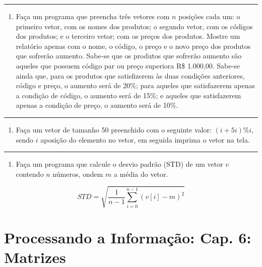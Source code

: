 \documentclass[12pt,a4paper]{article}
\renewcommand{\linethickness}{0.05em}
\providecommand{\tightlist}{%
      \setlength{\itemsep}{0pt}\setlength{\parskip}{0pt}}
\begin{document}
    \begin{center}\rule{0.5\linewidth}{\linethickness}\end{center}

\begin{enumerate}
\def\labelenumi{\arabic{enumi}.}
\setcounter{enumi}{32}
\tightlist
\item
  Faça um programa que preencha três vetores com \(n\) posições cada um:
  o primeiro vetor, com os nomes dos produtos; o segundo vetor, com os
  códigos dos produtos; e o terceiro vetor; com os preços dos produtos.
  Mostre um relatório apenas com o nome, o código, o preço e o novo
  preço dos produtos que sofrerão aumento. Sabe-se que os produtos que
  sofrerão aumento são aqueles que possuem código par ou preço superiora
  R\$ 1.000,00. Sabe-se ainda que, para os produtos que satisfizerem às
  duas condições anteriores, código e preço, o aumento será de 20\%;
  para aqueles que satisfazerem apenas a condição de código, o aumento
  será de 15\%; e aqueles que satisfazerem apenas a condição de preço, o
  aumento será de 10\%.
\end{enumerate}

    \begin{center}\rule{0.5\linewidth}{\linethickness}\end{center}

\begin{enumerate}
\def\labelenumi{\arabic{enumi}.}
\setcounter{enumi}{33}
\tightlist
\item
  Faça um vetor de tamanho 50 preenchido com o seguinte valor:
  \((i+5i)\%i\), sendo \(i\) aposição do elemento no vetor, em seguida
  imprima o vetor na tela.
\end{enumerate}

    \begin{center}\rule{0.5\linewidth}{\linethickness}\end{center}

\begin{enumerate}
\def\labelenumi{\arabic{enumi}.}
\setcounter{enumi}{34}
\tightlist
\item
  Faça um programa que calcule o desvio padrão (STD) de um vetor \(v\)
  contendo \(n\) números, ondem \(m\) a média do vetor.
\end{enumerate}

\[ STD = \sqrt{\frac{1}{n-1} \sum_{i=0}^{n-1}(v[i]-m)^2} \]

    \hypertarget{processando-a-informauxe7uxe3o-cap.-6-matrizes}{%
\section{Processando a Informação: Cap. 6:
Matrizes}\label{processando-a-informauxe7uxe3o-cap.-6-matrizes}}
\end{document}
